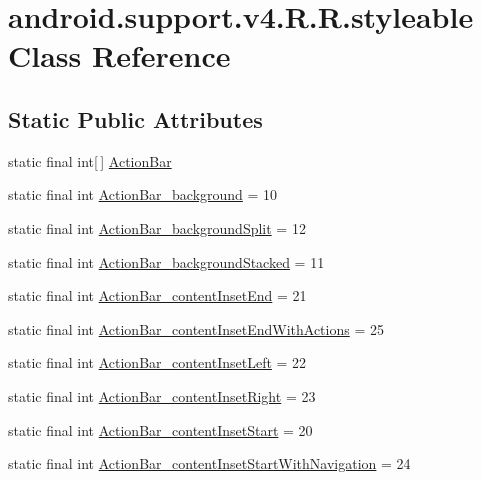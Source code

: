 \hypertarget{classandroid_1_1support_1_1v4_1_1_r_1_1styleable}{
\section{android.support.v4.R.R.styleable Class Reference}
\label{classandroid_1_1support_1_1v4_1_1_r_1_1styleable}
}
\subsection*{Static Public Attributes}
\begin{CompactItemize}
\item 
static final int\mbox{[}$\,$\mbox{]} \hyperlink{classandroid_1_1support_1_1v4_1_1_r_1_1styleable_5c6cf2c83551ebae05f365bb913fdddf}{ActionBar}
\item 
static final int \hyperlink{classandroid_1_1support_1_1v4_1_1_r_1_1styleable_7d91fb5bbb5c3d2bc5aec28f9ed002b4}{ActionBar\_\-background} = 10
\item 
static final int \hyperlink{classandroid_1_1support_1_1v4_1_1_r_1_1styleable_94fcfd07399863e568786b26bbb3deed}{ActionBar\_\-backgroundSplit} = 12
\item 
static final int \hyperlink{classandroid_1_1support_1_1v4_1_1_r_1_1styleable_afd1ae650dce54259899787ed8768401}{ActionBar\_\-backgroundStacked} = 11
\item 
static final int \hyperlink{classandroid_1_1support_1_1v4_1_1_r_1_1styleable_2fc65202296211aca68d2f909690758f}{ActionBar\_\-contentInsetEnd} = 21
\item 
static final int \hyperlink{classandroid_1_1support_1_1v4_1_1_r_1_1styleable_8f6d660506a9045530ddc8d45a060796}{ActionBar\_\-contentInsetEndWithActions} = 25
\item 
static final int \hyperlink{classandroid_1_1support_1_1v4_1_1_r_1_1styleable_22de0174bc46d66158777df4487ee6d2}{ActionBar\_\-contentInsetLeft} = 22
\item 
static final int \hyperlink{classandroid_1_1support_1_1v4_1_1_r_1_1styleable_c4907643708a044aecdbc76049dc1be0}{ActionBar\_\-contentInsetRight} = 23
\item 
static final int \hyperlink{classandroid_1_1support_1_1v4_1_1_r_1_1styleable_4b97a1950d9a8efde8b222a7b18c7301}{ActionBar\_\-contentInsetStart} = 20
\item 
static final int \hyperlink{classandroid_1_1support_1_1v4_1_1_r_1_1styleable_b66f0db25dbaa8260940ed3b91d9d0c5}{ActionBar\_\-contentInsetStartWithNavigation} = 24

\end{CompactItemize}
